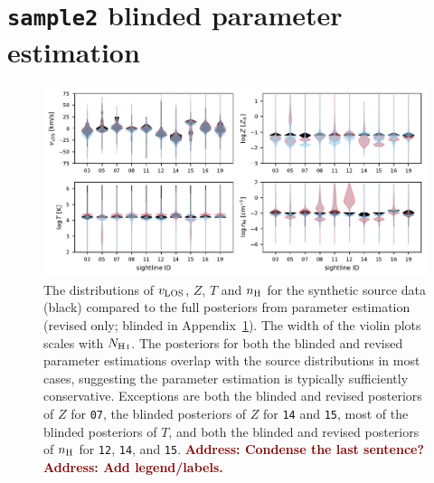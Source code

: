 \documentclass[fleqn,usenatbib]{mnras}
\newcommand{\todo}[1]{\textcolor{Maroon}{\textbf{Address: #1}}}
\begin{document}


\appendix

\section{\texttt{sample2} blinded parameter estimation}
\label{a: sample2 blinded}

\begin{figure}
    \centering
    \includegraphics[width=\textwidth]{figures/sample2/violin.pdf}
    \caption{
    The distributions of $v_{\rm LOS}$, $Z$, $T$ and $n_{\rm H}$ for the synthetic source data (black) compared to the full posteriors from parameter estimation (revised only; blinded in Appendix~\ref{a: sample2 blinded}).
    The width of the violin plots scales with $N_{\ion{H}{I}}$.
    The posteriors for both the blinded and revised parameter estimations overlap with the source distributions in most cases, suggesting the parameter estimation is typically sufficiently conservative.
    Exceptions are
    both the blinded and revised posteriors of $Z$ for \texttt{07},
    the blinded posteriors of $Z$ for \texttt{14} and \texttt{15},
    most of the blinded posteriors of $T$,
    and both the blinded and revised posteriors of $n_{\rm H}$ for \texttt{12}, \texttt{14}, and \texttt{15}.
    \todo{Condense the last sentence?}
    \todo{Add legend/labels.}
    }
    \label{f: sample2 violin both}
\end{figure}
\end{document}

